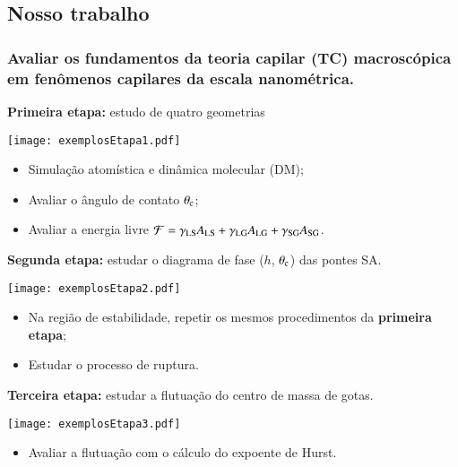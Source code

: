 \documentclass[8pt]{beamer}
\begin{document}
\subsection{Nosso trabalho}
\begin{frame}
\frametitle{Avaliar os {\bf fundamentos da teoria capilar (TC) macroscópica} em fenômenos capilares da escala nanométrica.}

\begin{block}{{\bf Primeira etapa:} estudo de quatro geometrias}
	\begin{minipage}{0.15\textwidth}
		\texttt{[image: exemplosEtapa1.pdf]}
	\end{minipage}
	\begin{minipage}{0.84\textwidth}
		\begin{itemize}
			\item Simulação atomística e dinâmica molecular (DM);
			\item Avaliar o ângulo de contato $\theta_{\rm c}$;
			\item Avaliar a energia livre $\mathcal F = \gamma_{\rm LS}A_{\rm LS} + \gamma_{\rm LG}A_{\rm LG} + \gamma_{\rm SG}A_{\rm SG}$.
		\end{itemize}
	\end{minipage}
\end{block}

\begin{block}{{\bf Segunda etapa:} estudar o diagrama de fase ($h$, $\theta_{\rm c}$) das pontes SA.}
	\begin{minipage}{0.19\textwidth}
		\texttt{[image: exemplosEtapa2.pdf]}
	\end{minipage}
	\begin{minipage}{0.8\textwidth}
		\begin{itemize}
			\item Na região de estabilidade, repetir os mesmos procedimentos da {\bf primeira etapa};
			\item Estudar o processo de ruptura.
		\end{itemize}
	\end{minipage}
\end{block}

\begin{block}{{\bf Terceira etapa:} estudar a flutuação do centro de massa de gotas.}
	\begin{minipage}{0.19\textwidth}
			\texttt{[image: exemplosEtapa3.pdf]}
	\end{minipage}
	\begin{minipage}{0.8\textwidth}
		\begin{itemize}
			\item Avaliar a flutuação com o cálculo do expoente de Hurst.
		\end{itemize}
	\end{minipage}
\end{block}


\end{frame}
\end{document}
